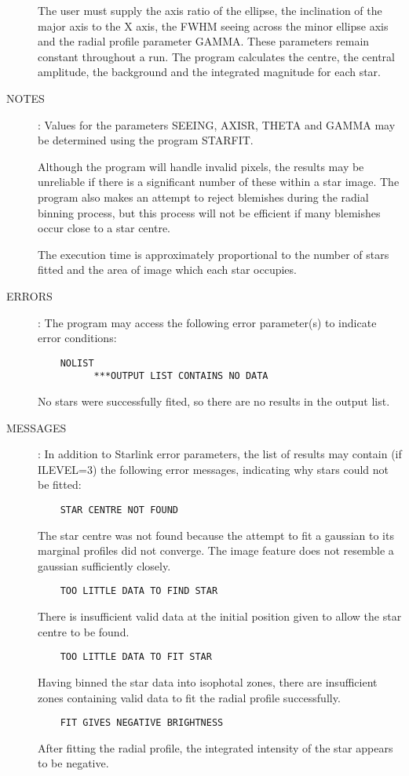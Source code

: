 \begin{description}
The user must supply the axis ratio of the ellipse, the inclination of the major
axis to the X axis, the FWHM seeing across the minor ellipse axis and the
radial profile parameter GAMMA.
These parameters remain constant throughout a run.
The program calculates the centre, the central amplitude, the background and the
integrated magnitude for each star.
\item [NOTES]:
Values for the parameters SEEING, AXISR, THETA and GAMMA may be determined
using the program STARFIT.

Although the program will handle invalid pixels, the results may be unreliable
if there is a significant number of these within a star image.
The program also makes an attempt to reject blemishes during the radial
binning process, but this process will not be efficient if many blemishes occur
close to a star centre.

The execution time is approximately proportional to the number of stars fitted
and the area of image which each star occupies.
\item [ERRORS]:
The program may access the following error parameter(s) to indicate error
conditions:
\begin{verbatim}
    NOLIST
          ***OUTPUT LIST CONTAINS NO DATA
\end{verbatim}
No stars were successfully fited, so there are no results in the output list.
\item [MESSAGES]:
In addition to Starlink error parameters, the list of results may contain (if
ILEVEL=3) the following error messages, indicating why stars could not be
fitted:
\begin{verbatim}
    STAR CENTRE NOT FOUND
\end{verbatim}
The star centre was not found because the attempt to fit a gaussian to its
marginal profiles did not converge.
The image feature does not resemble a gaussian sufficiently closely.
\begin{verbatim}
    TOO LITTLE DATA TO FIND STAR
\end{verbatim}
There is insufficient valid data at the initial position given to allow the
star centre to be found.
\begin{verbatim}
    TOO LITTLE DATA TO FIT STAR
\end{verbatim}
Having binned the star data into isophotal zones, there are insufficient zones
containing valid data to fit the radial profile successfully.
\begin{verbatim}
    FIT GIVES NEGATIVE BRIGHTNESS
\end{verbatim}
After fitting the radial profile, the integrated intensity of the star appears
to be negative.
\end{description}

